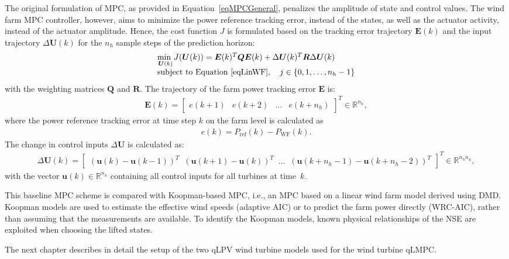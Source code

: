 The original formulation of MPC, as provided in Equation~\eqref{eqMPCGeneral}, penalizes the amplitude of state and control values. The wind farm MPC controller, however, aims to minimize the power reference tracking error, instead of the states, as well as the actuator activity, instead of the actuator amplitude. Hence, the cost function $J$ is formulated based on the tracking error trajectory $\bm{E}(k)$ and the input trajectory $\Delta \bm{U}(k)$ for the $n_h$ sample steps of the prediction horizon:
\begin{align} \label{eqObjFun1}
    \begin{array}{l} 
        \underset{\bm{U}(k)}{\text{min }} J(\bm{U}(k)) = \bm{E}(k)^T \bm{Q}\bm{E}(k) +\Delta \bm{U}(k)^T \bm{R} \Delta \bm{U}(k) \\
        \text{subject to Equation } \eqref{eqLinWF}, \quad   j \in \{0, 1, \dots, n_h-1\}
    \end{array}
\end{align}
%
with the weighting matrices $\bm{Q}$ and $\bm{R}$. The trajectory of the farm power tracking error $\bm{E}$ is:
\begin{align*}
    \bm{E}(k) = \begin{bmatrix} e(k+1) & e(k+2) & \dots & e(k + n_h) \end{bmatrix}^T \in \mathbb{R}^{n_h },
\end{align*}
where the power reference tracking error at time step $k$ on the farm level is calculated as 
\begin{align*}
    e(k) = P_{\text{ref}}(k) - P_{\text{WF}}(k). 
\end{align*}
%
The change in control inputs $\Delta \bm{U}$ is calculated as:
\begin{align*}
    \Delta \bm{U}(k) = \begin{bmatrix} (\bm{u}(k) - \bm{u}(k-1))^T \;\; (\bm{u}(k+1) - \bm{u}(k))^T \;\;\ldots\;\;  (\bm{u}(k+n_h - 1) - \bm{u}(k + n_h - 2))^T \end{bmatrix}^T \in \mathbb{R}^{n_h n_u },
\end{align*}
with the vector $\bm{u}(k) \in \mathbb{R}^{n_u }$ containing all control inputs for all turbines at time~$k$.

This baseline MPC scheme is compared with Koopman-based MPC, i.e., an MPC based on a linear wind farm model derived using DMD. Koopman models are used to estimate the effective wind speeds (adaptive AIC) or to predict the farm power directly (WRC-AIC), rather than assuming that the measurements are available. To identify the Koopman models, known physical relationships of the NSE are exploited when choosing the lifted states.

The next chapter describes in detail the setup of the two qLPV wind turbine models used for the wind turbine qLMPC.